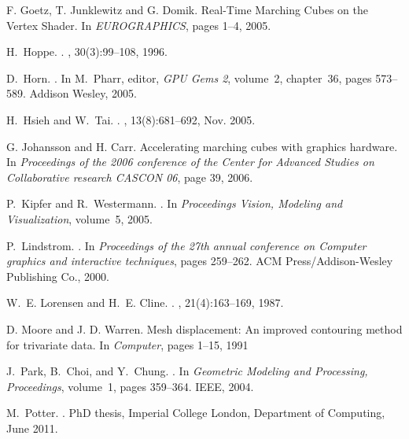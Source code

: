 \documentclass[10pt,journal,cspaper,compsoc]{IEEEtran}
\begin{document}
\begin{thebibliography}{10}
F. Goetz, T. Junklewitz and G. Domik.
\newblock Real-Time Marching Cubes on the Vertex Shader.
\newblock In {\em EUROGRAPHICS}, pages 1--4, 2005.

H.~Hoppe.
.
, 30(3):99--108, 1996.

D.~Horn.
.
\newblock In M.~Pharr, editor, {\em GPU Gems 2}, volume~2, chapter~36, pages
  573--589. Addison Wesley, 2005.

H.~Hsieh and W.~Tai.
.
, 13(8):681--692, Nov.
  2005.
  
G. Johansson and H. Carr.
\newblock Accelerating marching cubes with graphics hardware.
\newblock In {\em Proceedings of the 2006 conference of the Center for Advanced Studies on Collaborative research CASCON 06}, page 39, 2006.

P.~Kipfer and R.~Westermann.
.
\newblock In {\em Proceedings Vision, Modeling and Visualization}, volume~5,
  2005.

P.~Lindstrom.
.
\newblock In {\em Proceedings of the 27th annual conference on Computer
  graphics and interactive techniques}, pages 259--262. ACM
  Press/Addison-Wesley Publishing Co., 2000.

W.~E. Lorensen and H.~E. Cline.
.
, 21(4):163--169, 1987.

D. Moore and J. D. Warren.
\newblock Mesh displacement: An improved contouring method for trivariate data.
\newblock In {\em Computer}, pages 1--15, 1991

J.~Park, B.~Choi, and Y.~Chung.
.
\newblock In {\em Geometric Modeling and Processing, Proceedings}, volume~1,
  pages 359--364. IEEE, 2004.

M.~Potter.
.
\newblock PhD thesis, Imperial College London, Department of Computing, June
  2011.


\end{thebibliography}
\end{document}
